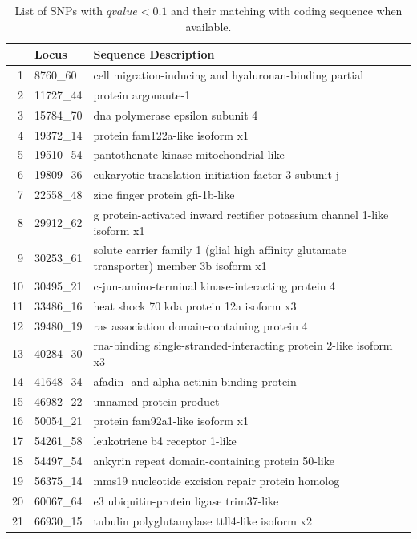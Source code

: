 \documentclass[nogrid]{MBE}%
\begin{document}
\begin{table}[ht]
\centering
\caption{List of SNPs with $qvalue < 0.1$ and their matching with coding sequence when available.}%
\label{tab:salmon}%
\begin{tabular}{rll}
  \hline
 & Locus & Sequence Description \\ 
  \hline
1 & 8760\_60 & cell migration-inducing and hyaluronan-binding partial \\ 
  2 & 11727\_44 & protein argonaute-1 \\ 
  3 & 15784\_70 & dna polymerase epsilon subunit 4 \\ 
  4 & 19372\_14 & protein fam122a-like isoform x1 \\ 
  5 & 19510\_54 & pantothenate kinase mitochondrial-like \\ 
  6 & 19809\_36 & eukaryotic translation initiation factor 3 subunit j \\ 
  7 & 22558\_48 & zinc finger protein gfi-1b-like \\ 
  8 & 29912\_62 & g protein-activated inward rectifier potassium channel 1-like isoform x1 \\ 
  9 & 30253\_61 & solute carrier family 1 (glial high affinity glutamate transporter) member 3b isoform x1 \\ 
  10 & 30495\_21 & c-jun-amino-terminal kinase-interacting protein 4 \\ 
  11 & 33486\_16 & heat shock 70 kda protein 12a isoform x3 \\ 
  12 & 39480\_19 & ras association domain-containing protein 4 \\ 
  13 & 40284\_30 & rna-binding single-stranded-interacting protein 2-like isoform x3 \\ 
  14 & 41648\_34 & afadin- and alpha-actinin-binding protein \\ 
  15 & 46982\_22 & unnamed protein product \\ 
  16 & 50054\_21 & protein fam92a1-like isoform x1 \\ 
  17 & 54261\_58 & leukotriene b4 receptor 1-like \\ 
  18 & 54497\_54 & ankyrin repeat domain-containing protein 50-like \\ 
  19 & 56375\_14 & mms19 nucleotide excision repair protein homolog \\ 
  20 & 60067\_64 & e3 ubiquitin-protein ligase trim37-like \\ 
  21 & 66930\_15 & tubulin polyglutamylase ttll4-like isoform x2 \\ 

\end{tabular}
\end{table}
\end{document}
